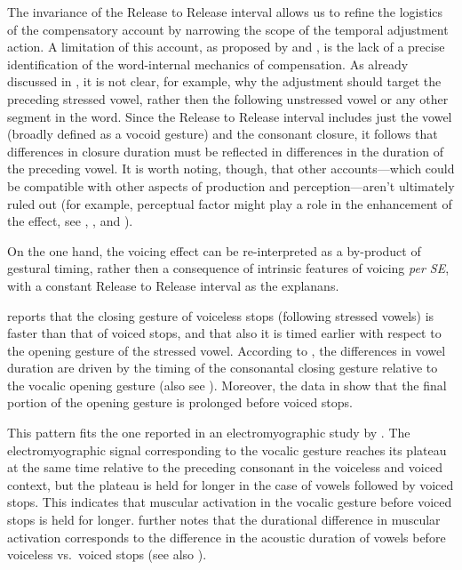 \documentclass[12pt,]{article}
\begin{document}
The invariance of the Release to Release interval allows us to refine
the logistics of the compensatory account by narrowing the scope of the
temporal adjustment action. A limitation of this account, as proposed by
\citet{slis1969} and \citet{lehiste1970}, is the lack of a precise
identification of the word-internal mechanics of compensation. As
already discussed in , it is not clear, for example, why
the adjustment should target the preceding stressed vowel, rather then
the following unstressed vowel or any other segment in the word. Since
the Release to Release interval includes just the vowel (broadly defined
as a vocoid gesture) and the consonant closure, it follows that
differences in closure duration must be reflected in differences in the
duration of the preceding vowel. It is worth noting, though, that other
accounts---which could be compatible with other aspects of production
and perception---aren't ultimately ruled out (for example, perceptual
factor might play a role in the enhancement of the effect, see
\citealt{kingston1994}, \citealt{port1982}, and \citealt{luce1985}).

On the one hand, the voicing effect can be re-interpreted as a
by-product of gestural timing, rather then a consequence of intrinsic
features of voicing \emph{per SE}, with a constant Release to Release
interval as the explanans.

\citet{de-jong1991} reports that the closing gesture of voiceless stops
(following stressed vowels) is faster than that of voiced stops, and
that also it is timed earlier with respect to the opening gesture of the
stressed vowel. According to \citet{de-jong1991}, the differences in
vowel duration are driven by the timing of the consonantal closing
gesture relative to the vocalic opening gesture (also see
\citealt{hertrich1997}). Moreover, the data in \citet{de-jong1991} show
that the final portion of the opening gesture is prolonged before voiced
stops.

This pattern fits the one reported in an electromyographic study by
\citet{raphael1975}. The electromyographic signal corresponding to the
vocalic gesture reaches its plateau at the same time relative to the
preceding consonant in the voiceless and voiced context, but the plateau
is held for longer in the case of vowels followed by voiced stops. This
indicates that muscular activation in the vocalic gesture before voiced
stops is held for longer. \citet{raphael1975} further notes that the
durational difference in muscular activation corresponds to the
difference in the acoustic duration of vowels before voiceless
vs.~voiced stops (see also \citealt{warren2005}).
\end{document}
